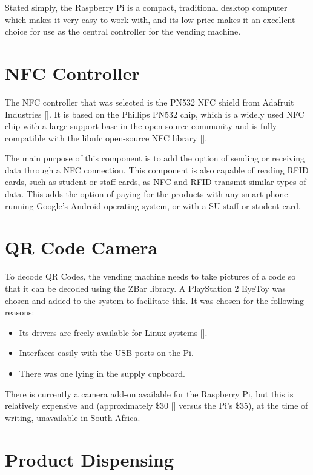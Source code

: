 Stated simply, the Raspberry Pi is a compact, traditional desktop computer which makes it very
easy to work with, and its low price makes it an excellent choice for use as the central
controller for the vending machine.

\section{NFC Controller}

The NFC controller that was selected is the PN532 NFC shield from Adafruit Industries
[\cite{website:adafruit-nfc}]. It is based on the Phillips PN532 chip, which is a widely used
NFC chip with a large support base in the open source community and is fully compatible with
the libnfc open-source NFC library [\cite{website:libnfc-hardware}].
 
The main purpose of this component is to add the option of sending or receiving data through a NFC connection.
This component is also capable of reading RFID cards, such as student or staff cards, as NFC
and RFID transmit similar types of data. This adds the option of paying for the products with 
any smart phone running Google's Android  operating system, or with a SU staff or student card.

\section{QR Code Camera}

To decode QR Codes, the vending machine needs to take pictures of a code so that it can be
decoded using the ZBar library. A PlayStation 2 EyeToy was chosen and added to the system to
facilitate this. It was chosen for the following reasons:

\begin{itemize}
  \item Its drivers are freely available for Linux systems [\cite{website:webcam-drivers}].
  \item Interfaces easily with the USB ports on the Pi.
  \item There was one lying in the supply cupboard.
\end{itemize}

There is currently a camera add-on available for the Raspberry Pi, but this is relatively
expensive and (approximately \$30 [\cite{website:raspi-camera}] versus the Pi's \$35), at the
time of writing, unavailable in South Africa.

\section{Product Dispensing}

